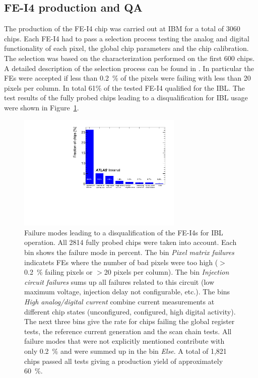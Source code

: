 \subsection{FE-I4 production and QA}
\label{sec:mod_electronic}
The production of the FE-I4 chip was carried out at IBM for a total of 3060 chips. Each FE-I4 had to pass a selection process testing the analog and digital functionality of each pixel, the global chip parameters and the chip calibration. The selection was based on the characterization performed on the first 600 chips.  A detailed description of the selection process can be found in \cite{WaferAnalysis}. In particular the FEs were accepted if less than \SI{0.2}{\percent} of the pixels were failing with less than 20 pixels per column. 
In total 61$\percent$ of the tested FE-I4 qualified for the IBL. The test results of the fully probed chips leading to a disqualification for IBL usage were shown in Figure~\ref{fig:failures}.
%
\begin{figure}
	\centering
		 \includegraphics[width=0.7\textwidth]{Images/ibl_paper/chapter04_Modules/failures.pdf}
	\caption{\textbf{}Failure modes leading to a disqualification of the FE-I4s for IBL operation. All 2814 fully probed chips were taken into account. Each bin shows the failure mode in percent. The bin \textit{Pixel matrix failures} indicatets FEs where the number of bad pixels were too high ($>$\SI{0.2}{\percent} failing pixels or $>$20 pixels per column). The bin \textit{Injection circuit failures} sums up all failures related to this circuit (low maximum voltage, injection delay not configurable, etc.). The bins \textit{High analog/digital current} combine current measurements at different chip states (unconfigured, configured, high digital activity). The next three bins give the rate for chips failing the global register tests, the reference current generation and the scan chain tests. All failure modes that were not explicitly mentioned contribute with only \SI{0.2}{\percent} and were summed up in the bin \textit{Else}. A total of 1,821 chips passed all tests giving a production yield of approximately \SI{60}{\percent}.}
\label{fig:failures}
\end{figure}
